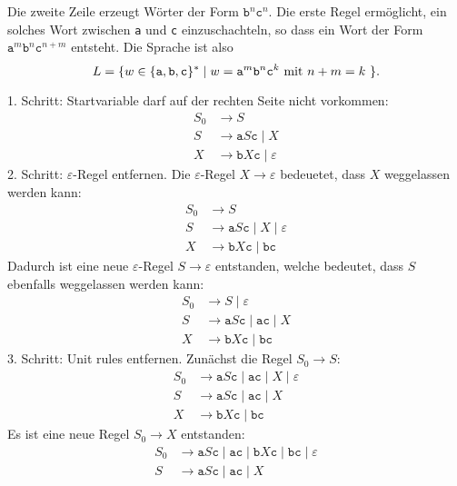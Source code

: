 \begin{loesung}
\begin{teilaufgaben}
\item
Die zweite Zeile erzeugt Wörter der Form $\texttt{b}^n\texttt{c}^n$.
Die erste Regel ermöglicht, ein solches Wort zwischen \texttt{a} und
\texttt{c} einzuschachteln, so dass ein Wort der Form
$\texttt{a}^m\texttt{b}^n\texttt{c}^{n+m}$ entsteht.
Die Sprache ist also
\[
L=\{
w\in\{\texttt{a},\texttt{b},\texttt{c}\}^*
\;|\;
\text{$
w=
\texttt{a}^m \texttt{b}^n \texttt{c}^{k}$
mit
$n+m=k$
}
\}.
\]
\item
1. Schritt: Startvariable darf auf der rechten Seite nicht vorkommen:
\begin{align*}
S_0 & \to S
\\
S & \to \texttt{a} S \texttt{c} \;|\; X
\\
X & \to \texttt{b}X\texttt{c} \;|\; \varepsilon
\end{align*}
2. Schritt: $\varepsilon$-Regel entfernen.
Die $\varepsilon$-Regel $X\to\varepsilon$ bedeuetet, dass $X$ weggelassen
werden kann:
\begin{align*}
S_0 & \to S
\\
S & \to \texttt{a} S \texttt{c} \;|\; X \;|\; \varepsilon
\\
X & \to \texttt{b}X\texttt{c} \;|\; \texttt{bc}
\end{align*}
Dadurch ist eine neue $\varepsilon$-Regel $S\to\varepsilon$ entstanden,
welche bedeutet, dass $S$ ebenfalls weggelassen werden kann:
\begin{align*}
S_0 & \to S \;|\; \varepsilon
\\
S & \to
\texttt{a} S \texttt{c} \;|\; \texttt{ac} \;|\; X
\\
X & \to \texttt{b}X\texttt{c} \;|\; \texttt{bc}
\end{align*}
3. Schritt: Unit rules entfernen.
Zunächst die Regel $S_0\to S$:
\begin{align*}
S_0 & \to
\texttt{a} S \texttt{c} \;|\; \texttt{ac} \;|\; X \;|\; \varepsilon
\\
S & \to
\texttt{a} S \texttt{c} \;|\; \texttt{ac} \;|\; X
\\
X & \to \texttt{b}X\texttt{c} \;|\; \texttt{bc}
\end{align*}
Es ist eine neue Regel $S_0\to X$ entstanden:
\begin{align*}
S_0 & \to
\texttt{a} S \texttt{c} \;|\; \texttt{ac} \;|\;
\texttt{b}X\texttt{c} \;|\; \texttt{bc}
\;|\; \varepsilon
\\
S & \to
\texttt{a} S \texttt{c} \;|\; \texttt{ac} \;|\; X

\end{align*}
\end{teilaufgaben}
\end{loesung}
